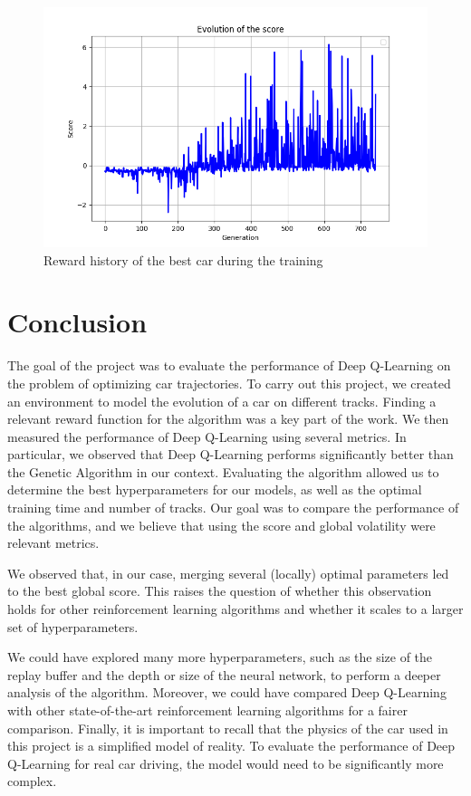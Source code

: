 \documentclass[11pt,a4paper]{article}
\newcounter{fig}
\begin{document}
        \begin{figure}[h]
            \centering
            \includegraphics[scale=0.6]{reward best car.png}
            \caption{Reward history of the best car during the training}
            \label{figure:Best_car_reward}
        \end{figure}

    
    \section*{Conclusion}

    The goal of the project was to evaluate the performance of Deep Q-Learning on the problem of optimizing car trajectories. To carry out this project, we created an environment to model the evolution of a car on different tracks. Finding a relevant reward function for the algorithm was a key part of the work.
    We then measured the performance of Deep Q-Learning using several metrics. In particular, we observed that Deep Q-Learning performs significantly better than the Genetic Algorithm in our context. Evaluating the algorithm allowed us to determine the best hyperparameters for our models, as well as the optimal training time and number of tracks. Our goal was to compare the performance of the algorithms, and we believe that using the score and global volatility were relevant metrics.
    
    We observed that, in our case, merging several (locally) optimal parameters led to the best global score. This raises the question of whether this observation holds for other reinforcement learning algorithms and whether it scales to a larger set of hyperparameters.
    
    We could have explored many more hyperparameters, such as the size of the replay buffer and the depth or size of the neural network, to perform a deeper analysis of the algorithm. Moreover, we could have compared Deep Q-Learning with other state-of-the-art reinforcement learning algorithms for a fairer comparison. Finally, it is important to recall that the physics of the car used in this project is a simplified model of reality. To evaluate the performance of Deep Q-Learning for real car driving, the model would need to be significantly more complex.
    
\end{document}
